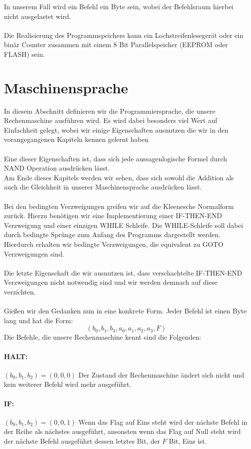 \documentclass[11pt,a4paper,leqno]{report}
\numberwithin{equation}{chapter}
\begin{document}
In unserem Fall wird ein Befehl ein Byte sein, wobei der Befehlsraum hierbei nicht ausgelastet wird.\\
\\
Die Realisierung des Programmspeichers kann ein Lochstreifenleseger\"at oder ein bin\"ar Counter zusammen mit einem 8 Bit Parallelspeicher (EEPROM oder FLASH) sein.
\section{Maschinensprache}
In diesem Abschnitt definieren wir die Programmiersprache, die unsere Rechenmaschine ausf\"uhren wird. Es wird dabei besonders viel Wert auf Einfachheit gelegt, wobei wir einige Eigenschaften ausnutzen die wir in den vorangegangenen Kapiteln kennen gelernt haben\\
\\
Eine dieser Eigenschaften ist, dass sich jede aussagenlogische Formel durch NAND Operation ausdr\"ucken l\"asst.\\
Am Ende dieses Kapitels werden wir sehen, dass sich sowohl die Addition als auch die Gleichheit in unserer Maschinensprache ausdr\"ucken l\"asst.\\
\\
Bei den bedingten Verzweigungen greifen wir auf die Kleenesche Normalform zur\"uck. Hierzu ben\"otigen wir eine Implementierung einer IF-THEN-END Verzweigung und einer einzigen WHILE Schleife. Die WHILE-Schleife soll dabei durch bedingte Spr\"unge zum Anfang des Programms dargestellt werden. Hierdurch erhalten wir bedingte Verzweigungen, die equivalent zu GOTO Verzweigungen sind.\\
\\
Die letzte Eigenschaft die wir ausnutzen ist, dass verschachtelte IF-THEN-END Verzweigungen nicht notwendig sind und wir werden demnach auf diese verzichten.\\
\\
Gie\ss{}en wir den Gedanken nun in eine konkrete Form.
Jeder Befehl ist einen Byte lang und hat die Form:
$$(b_0, b_1, b_3, a_0, a_1, a_2, a_3, F)$$
Die Befehle, die unsere Rechenmaschine kennt sind die Folgenden:
\paragraph{HALT:} $(b_0, b_1, b_2) = (0, 0, 0)$ Der Zustand der Rechenmaschine \"andert sich nicht und kein weiterer Befehl wird mehr ausgef\"uhrt.
\paragraph{IF:} $(b_0, b_1, b_2) = (0, 0, 1)$ Wenn das Flag auf Eins steht wird der n\"achste Befehl in der Reihe als n\"achstes ausgef\"uhrt, ansonsten wenn das Flag auf Null steht wird der n\"achste Befehl ausgef\"uhrt dessen letztes Bit, der $F$ Bit, Eins ist.
\end{document}
